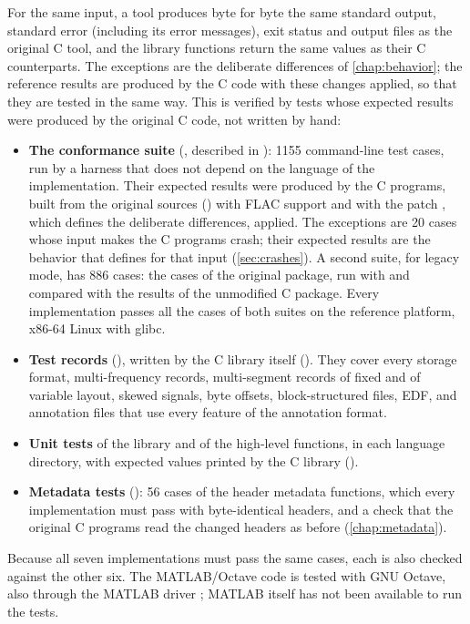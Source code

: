 For the same input, a \wfdbx{} tool produces byte for byte the same standard
output, standard error (including its error messages), exit status and
output files as the original C tool, and the library functions return the
same values as their C counterparts. The exceptions are the deliberate
differences of \cref{chap:behavior}; the reference results are produced by
the C code with these changes applied, so that they are tested in the same
way. This is verified by tests whose expected results were produced by the
original C code, not written by hand:
\begin{itemize}
\item \textbf{The conformance suite} (, described in
  ): 1155 command-line test cases, run by a
  harness that does not depend on the language of the implementation. Their
  expected results were produced by the C programs, built from the original
  sources () with FLAC support and with
  the patch , which defines the
  deliberate differences, applied. The exceptions are 20 cases whose input
  makes the C programs crash; their expected results are the behavior that
  \wfdbx{} defines for that input (\cref{sec:crashes}). A second suite, for
  legacy mode, has 886 cases: the cases of the original package, run with
   and compared with the results of the unmodified C package.
  Every implementation passes all the cases of both suites on the reference
  platform, x86-64 Linux with glibc.
\item \textbf{Test records} (), written by the C library
  itself (). They cover every storage
  format, multi-frequency records, multi-segment records of fixed and of
  variable layout, skewed signals, byte offsets, block-structured files, EDF,
  and annotation files that use every feature of the annotation format.
\item \textbf{Unit tests} of the library and of the high-level functions, in
  each language directory, with expected values printed by the C library
  ().
\item \textbf{Metadata tests} (): 56 cases of the
  header metadata functions, which every implementation must pass with
  byte-identical headers, and a check that the original C programs read the
  changed headers as before (\cref{chap:metadata}).
\end{itemize}
Because all seven implementations must pass the same cases, each is also
checked against the other six. The MATLAB/Octave code is tested with GNU
Octave, also through the MATLAB driver ;
MATLAB itself has not been available to run the tests.

